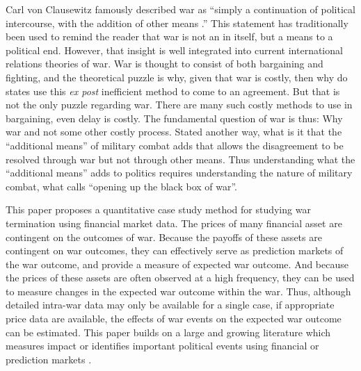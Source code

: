 



Carl von Clausewitz famously described war as ``simply a continuation of political intercourse, with the addition of other means \parencite[605]{Clausewitz1989}.'' %
This statement has traditionally been used to remind the reader that
war is not an in itself, but a means to a political end. %
However, that insight is well integrated into current international relations theories of war. %
War is thought to consist of both bargaining and fighting, and the theoretical puzzle is why, given that war is costly, then why do states use this \textit{ex post} inefficient method to come to an agreement. %
But that is not the only puzzle regarding war. %
There are many such costly methods to use in bargaining, even delay is costly. %
The fundamental question of war is thus: Why war and not some other costly process. %
Stated another way, what is it that the ``additional means'' of military combat adds that allows the disagreement to be resolved through war but not through other means. %
Thus understanding what the ``additional means'' adds to politics requires understanding the nature of military combat, what \textcite{Gartner1998} calls ``opening up the black box of war''.

This paper proposes a quantitative case study method for studying war termination using financial market data. The prices of many financial asset are contingent on the outcomes of war. Because the payoffs of these assets are contingent on war outcomes, they can effectively serve as prediction markets of the war outcome, and provide a measure of expected war outcome. And because the prices of these assets are often observed at a high frequency, they can be used to measure changes in the expected war outcome within the war. Thus, although
detailed intra-war data may only be available for a single case, if
appropriate price data are available, the effects of war events on the
expected war outcome can be estimated. This paper builds on a large and
growing literature which measures impact or identifies important
political events using financial
\parencites{NorthWeingast1989}{north2000introd}{FreyKucher2000}{sussman2000instit}{wells2000revol}{Herron2000}{eldor2004finan}{ChenSiems2004}{Greenstone2007}
or prediction
markets \parencites{WolfersZitzewitz2004}{ArrowForsytheGorhamEtAl2008}{WolfersZitzewitz2009}.


